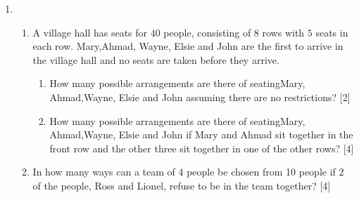 \documentclass[a4paper]{article}
\begin{document}
\begin{enumerate}
\begin{enumerate}[label=(\roman*)]
	\end{enumerate}
	
	
	\item \begin{enumerate}[label=(\roman*)]
		\item A village hall has seats for $40$ people, consisting of $8$ rows with $5$ seats in each row. Mary,Ahmad, Wayne, Elsie and John are the first to arrive in the village hall and no seats are taken
		before they arrive.
		
		\begin{enumerate}[label=(\alph*)]
			\item How many possible arrangements are there of seatingMary, Ahmad,Wayne, Elsie and John
			assuming there are no restrictions? \hfill[2]
			\vspace{2cm}
			\item How many possible arrangements are there of seatingMary, Ahmad,Wayne, Elsie and John
			if Mary and Ahmad sit together in the front row and the other three sit together in one of
			the other rows? \hfill[4]
			\vspace{2cm}
		\end{enumerate}
		\item  In how many ways can a team of $4$ people be chosen from 10 people if $2$ of the people, Ross and Lionel, refuse to be in the team together? \hfill [4]
		\vspace{3cm}
	\end{enumerate}
	
	
	
	

\end{enumerate}
\end{document}
